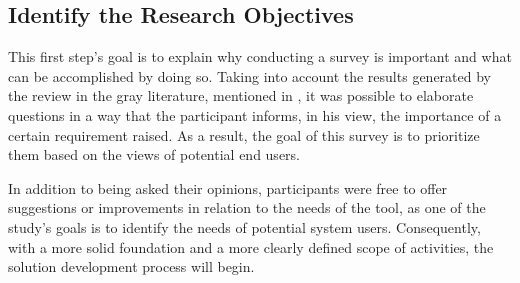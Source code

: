 

\subsection{Identify the Research Objectives} \label{sec:survey-objectives}


This first step's goal is to explain why conducting a survey is important and what can be accomplished by doing so.
Taking into account the results generated by the review in the gray literature, mentioned in , it was possible to elaborate questions in a way that the participant informs, in his view, the importance of a certain requirement raised.
As a result, the goal of this survey is to prioritize them based on the views of potential end users.


In addition to being asked their opinions, participants were free to offer suggestions or improvements in relation to the needs of the tool, as one of the study's goals is to identify the needs of potential system users.
Consequently, with a more solid foundation and a more clearly defined scope of activities, the solution development process will begin.
